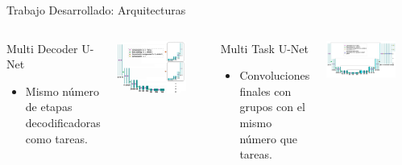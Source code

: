 \documentclass[xcolor=dvipsnames,table]{beamer}
\begin{document}
\begin{frame}{Trabajo Desarrollado: Arquitecturas}
	\begin{columns}[T]
		\begin{block}{Multi Decoder U-Net}
			\begin{itemize}
					\item Mismo número de etapas decodificadoras como tareas.
			\end{itemize}
		\end{block}
		\begin{center}
			\includegraphics[width=0.8\textwidth]{my_images/metodologia/Multi.png}
		\end{center}
		
		\begin{block}{Multi Task U-Net}
			\begin{itemize}

		\item Convoluciones finales con grupos con el mismo número que tareas.

\end{itemize}
		\end{block}
		\begin{center}
			\includegraphics[width=0.8\textwidth]{my_images/metodologia/groups.png}
		\end{center}
	\end{columns}
\end{frame}
\end{document}
